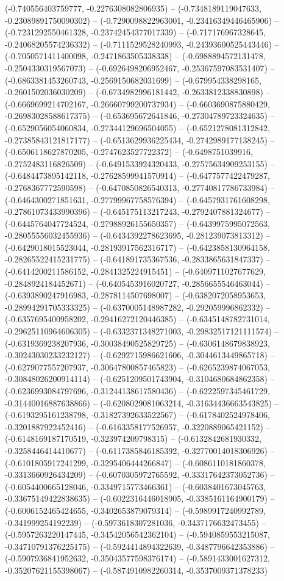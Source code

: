 (-0.740556403759777, -0.2276308082806935) -- (-0.7348189119047633, -0.23089891750090302) -- (-0.7290098822963001, -0.23416349446465906) -- (-0.7231292550461328, -0.23742454377017339) -- (-0.717176967328645, -0.24068205574236332) -- (-0.7111529528240993, -0.24393600525443446) -- (-0.7050571411400098, -0.2471863505338338) -- (-0.6988894572131478, -0.2504330319567073) -- (-0.6926498206952467, -0.25367597083531407) -- (-0.6863381453260743, -0.2569150682031699) -- (-0.679954338298165, -0.2601502036030209) -- (-0.6734982996181442, -0.2633812338830898) -- (-0.6669699214702167, -0.26660799200737934) -- (-0.6603690875880429, -0.26983028588617375) -- (-0.653695672641846, -0.27304789723324635) -- (-0.6529056054060834, -0.27344129696504055) -- (-0.6521278081312842, -0.27385843121817177) -- (-0.6513629936225434, -0.2742989177138245) -- (-0.6506118627870205, -0.2747623527722372) -- (-0.6498751039916, -0.2752483116826509) -- (-0.6491533924320433, -0.27575634909253155) -- (-0.6484473895142118, -0.27628599941570914) -- (-0.6477577422479287, -0.2768367772590598) -- (-0.6470850826540313, -0.27740817786733984) -- (-0.6464300271851631, -0.27799967758576394) -- (-0.6457931761608298, -0.27861073433990396) -- (-0.645175113217243, -0.2792407881324677) -- (-0.6445764047724524, -0.27988926155650357) -- (-0.6439975995072563, -0.28055556032455936) -- (-0.6434392278623695, -0.281239073813312) -- (-0.6429018015523044, -0.28193917562316717) -- (-0.6423858130964158, -0.28265522415231775) -- (-0.641891735367536, -0.2833865631847337) -- (-0.6414200211586152, -0.2841325224915451) -- (-0.6409711027677629, -0.2848924184452671) -- (-0.6405453916020727, -0.2856655546463044) -- (-0.6393890247916983, -0.2878114507698007) -- (-0.6382072058953653, -0.28994291705333325) -- (-0.6370005148987282, -0.292059996862332) -- (-0.6357695400958202, -0.29416272120446385) -- (-0.6345148782731014, -0.29625110964606305) -- (-0.6332371348271003, -0.29832517121111574) -- (-0.6319369238207936, -0.30038490525829725) -- (-0.6306148679838923, -0.30243030233232127) -- (-0.6292715986621606, -0.3044613449865718) -- (-0.6279077557207937, -0.30647800857465823) -- (-0.6265239874067053, -0.30848026200914114) -- (-0.6251209501743904, -0.3104680684862358) -- (-0.6236993084797696, -0.31244138617580436) -- (-0.6222597345461729, -0.31440016887638866) -- (-0.6208029081063214, -0.31634436663543825) -- (-0.6193295161238798, -0.31827392633522567) -- (-0.6178402524978406, -0.3201887922452416) -- (-0.6163358177526957, -0.3220889065421152) -- (-0.6148169187170519, -0.323974209798315) -- (-0.6132842681930332, -0.3258446414410677) -- (-0.6117385846185392, -0.32770014018306926) -- (-0.6101805917241299, -0.3295406444266847) -- (-0.6086110181860378, -0.3313660926434209) -- (-0.6070305972765592, -0.33317642373052736) -- (-0.6054400665128046, -0.3349715773466361) -- (-0.6038401673045763, -0.33675149422838635) -- (-0.6022316446018905, -0.3385161164900179) -- (-0.6006152465424655, -0.3402653879079314) -- (-0.5989917240992789, -0.341999254192239) -- (-0.5973618307281036, -0.3437176632473455) -- (-0.5957263220147445, -0.34542056542362104) -- (-0.5940859553215087, -0.34710791376225175) -- (-0.5924414894322639, -0.3487796642353886) -- (-0.5907936841952632, -0.35043577598376174) -- (-0.5891433001627312, -0.35207621155398067) -- (-0.5874910982260314, -0.3537009371378233) 